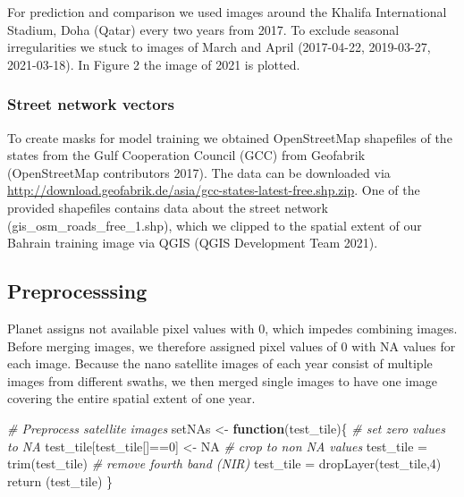 \documentclass[
]{article}
\newenvironment{Shaded}{\begin{snugshade}}{\end{snugshade}}
\newcommand{\CommentTok}[1]{\textcolor[rgb]{0.56,0.35,0.01}{\textit{#1}}}
\newcommand{\ConstantTok}[1]{\textcolor[rgb]{0.00,0.00,0.00}{#1}}
\newcommand{\ControlFlowTok}[1]{\textcolor[rgb]{0.13,0.29,0.53}{\textbf{#1}}}
\newcommand{\DecValTok}[1]{\textcolor[rgb]{0.00,0.00,0.81}{#1}}
\newcommand{\FunctionTok}[1]{\textcolor[rgb]{0.00,0.00,0.00}{#1}}
\newcommand{\NormalTok}[1]{#1}
\newcommand{\OtherTok}[1]{\textcolor[rgb]{0.56,0.35,0.01}{#1}}
\newcommand{\SpecialCharTok}[1]{\textcolor[rgb]{0.00,0.00,0.00}{#1}}
\begin{document}
For prediction and comparison we used images around the Khalifa
International Stadium, Doha (Qatar) every two years from 2017. To
exclude seasonal irregularities we stuck to images of March and April
(2017-04-22, 2019-03-27, 2021-03-18). In Figure 2 the image of 2021 is
plotted.

\hypertarget{street-network-vectors}{%
\subsubsection{Street network vectors}\label{street-network-vectors}}

To create masks for model training we obtained OpenStreetMap shapefiles
of the states from the Gulf Cooperation Council (GCC) from Geofabrik
(OpenStreetMap contributors 2017). The data can be downloaded via
\url{http://download.geofabrik.de/asia/gcc-states-latest-free.shp.zip}.
One of the provided shapefiles contains data about the street network
(gis\_osm\_roads\_free\_1.shp), which we clipped to the spatial extent
of our Bahrain training image via QGIS (QGIS Development Team 2021).

\hypertarget{preprocesssing}{%
\subsection{Preprocesssing}\label{preprocesssing}}

Planet assigns not available pixel values with 0, which impedes
combining images. Before merging images, we therefore assigned pixel
values of 0 with NA values for each image. Because the nano satellite
images of each year consist of multiple images from different swaths, we
then merged single images to have one image covering the entire spatial
extent of one year.

\begin{Shaded}
\begin{Highlighting}[]
\CommentTok{\# Preprocess satellite images}
\NormalTok{setNAs }\OtherTok{\textless{}{-}} \ControlFlowTok{function}\NormalTok{(test\_tile)\{}
  \CommentTok{\# set zero values to NA}
\NormalTok{  test\_tile[test\_tile[]}\SpecialCharTok{==}\DecValTok{0}\NormalTok{] }\OtherTok{\textless{}{-}} \ConstantTok{NA}
  \CommentTok{\# crop to non NA values}
\NormalTok{  test\_tile }\OtherTok{=} \FunctionTok{trim}\NormalTok{(test\_tile)}
  \CommentTok{\# remove fourth band (NIR)}
\NormalTok{  test\_tile }\OtherTok{=} \FunctionTok{dropLayer}\NormalTok{(test\_tile,}\DecValTok{4}\NormalTok{)}
  \FunctionTok{return}\NormalTok{ (test\_tile)}
\NormalTok{  \}}
\end{Highlighting}
\end{Shaded}
\end{document}
